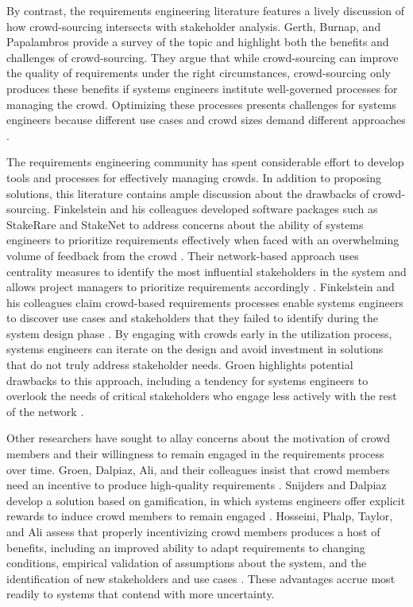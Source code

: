 By contrast, the requirements engineering literature features a lively discussion of how crowd-sourcing intersects with stakeholder analysis. Gerth, Burnap, and Papalambros provide a survey of the topic and highlight both the benefits and challenges of crowd-sourcing. They argue that while crowd-sourcing can improve the quality of requirements under the right circumstances, crowd-sourcing only produces these benefits if systems engineers institute well-governed processes for managing the crowd. Optimizing these processes presents challenges for systems engineers because different use cases and crowd sizes demand different approaches \cite{gerth}.

The requirements engineering community has spent considerable effort to develop tools and processes for effectively managing crowds. In addition to proposing solutions, this literature contains ample discussion about the drawbacks of crowd-sourcing. Finkelstein and his colleagues developed software packages such as StakeRare and StakeNet to address concerns about the ability of systems engineers to prioritize requirements effectively when faced with an overwhelming volume of feedback from the crowd \cite{stakerare, stakenet}. Their network-based approach uses centrality measures to identify the most influential stakeholders in the system and allows project managers to prioritize requirements accordingly \cite{lim}. Finkelstein and his colleagues claim crowd-based requirements processes enable systems engineers to discover use cases and stakeholders that they failed to identify during the system design phase \cite{stakerare}. By engaging with crowds early in the utilization process, systems engineers can iterate on the design and avoid investment in solutions that do not truly address stakeholder needs. Groen highlights potential drawbacks to this approach, including a tendency for systems engineers to overlook the needs of critical stakeholders who engage less actively with the rest of the network \cite{groen}.

Other researchers have sought to allay concerns about the motivation of crowd members and their willingness to remain engaged in the requirements process over time. Groen, Dalpiaz, Ali, and their colleagues insist that crowd members need an incentive to produce high-quality requirements \cite{groen}. Snijders and Dalpiaz develop a solution based on gamification, in which systems engineers offer explicit rewards to induce crowd members to remain engaged \cite{snijders, snijders2}. Hosseini, Phalp, Taylor, and Ali assess that properly incentivizing crowd members produces a host of benefits, including an improved ability to adapt requirements to changing conditions, empirical validation of assumptions about the system, and the identification of new stakeholders and use cases \cite{hosseini}. These advantages accrue most readily to systems that contend with more uncertainty.

